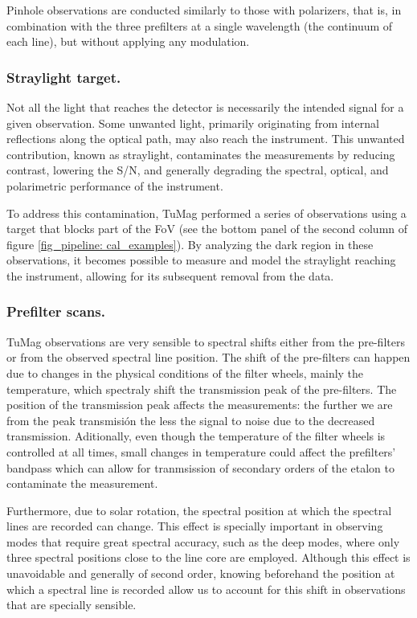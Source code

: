 Pinhole observations are conducted similarly to those with polarizers, that is, in combination with the three prefilters at a single wavelength (the continuum of each line), but without applying any modulation.

\subsubsection{Straylight target.}

Not all the light that reaches the detector is necessarily the intended signal for a given observation. Some unwanted light, primarily originating from internal reflections along the optical path, may also reach the instrument. This unwanted contribution, known as straylight, contaminates the measurements by reducing contrast, lowering the S/N, and generally degrading the spectral, optical, and polarimetric performance of the instrument.

To address this contamination, TuMag performed a series of observations using a target that blocks part of the FoV (see the bottom panel of the second column of figure \ref{fig_pipeline: cal_examples}). By analyzing the dark region in these observations, it becomes possible to measure and model the straylight reaching the instrument, allowing for its subsequent removal from the data.

\subsubsection{\label{ref:spectral_scans}Prefilter scans.}

TuMag observations are very sensible to spectral shifts either from the pre-filters or from the observed spectral line position. The shift of the pre-filters can happen due to changes in the physical conditions of the filter wheels, mainly the temperature, which spectraly shift the transmission peak of the pre-filters. The position of the transmission peak affects the measurements: the further we are from the peak transmisión the less the signal to noise due to the decreased transmission. Aditionally, even though the temperature of the filter wheels is controlled at all times, small changes in temperature could affect the prefilters' bandpass which can allow for tranmsission of secondary orders of the etalon to contaminate the measurement.

Furthermore, due to solar rotation, the spectral position at which the spectral lines are recorded can change. This effect is specially important in observing modes that require great spectral accuracy, such as the deep modes, where only three spectral positions close to the line core are employed. Although this effect is unavoidable and generally of second order, knowing beforehand the position at which a spectral line is recorded allow us to account for this shift in observations that are specially sensible.  

